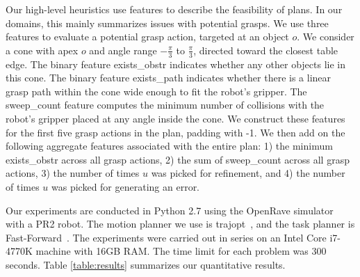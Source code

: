 Our high-level heuristics use features to describe the feasibility of
plans. In our domains, this mainly summarizes issues with potential
grasps. We use three features to evaluate a potential grasp action,
targeted at an object $o$. We consider a cone with apex $o$ and angle range
$-\frac{\pi}{3}$ to $\frac{\pi}{3}$, directed toward the closest table edge. The
binary feature exists\_obstr indicates whether any
other objects lie in this cone. The binary feature exists\_path
indicates whether there is a linear grasp path within the cone wide
enough to fit the robot's gripper. The
sweep\_count feature computes the minimum number of collisions with the robot's
gripper placed at any angle inside the cone.
We construct these features for the first five grasp actions in the
plan, padding with -1. We then add on the following
aggregate features associated with the entire plan: 1) the minimum
exists\_obstr across all grasp actions, 2) the sum of sweep\_count
across all grasp actions, 3) the number of times $u$ was picked for
refinement, and 4) the number of times $u$ was picked for generating
an error.

Our experiments are conducted in Python 2.7 using the OpenRave
simulator~\cite{Diankov_2008_6117} with a PR2 robot.  The motion
planner we use is trajopt~\cite{schulman2013finding}, and the task
planner is Fast-Forward~\cite{FF}.  The experiments were carried out
in series on an Intel Core i7-4770K machine with 16GB RAM. The time limit
for each problem was 300 seconds. Table
\ref{table:results} summarizes our quantitative results.


